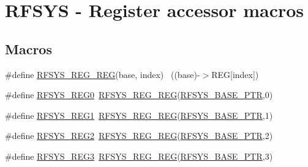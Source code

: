 \hypertarget{group___r_f_s_y_s___register___accessor___macros}{}\section{R\+F\+S\+YS -\/ Register accessor macros}
\label{group___r_f_s_y_s___register___accessor___macros}
\subsection*{Macros}
\begin{DoxyCompactItemize}
\item 
\#define \hyperlink{group___r_f_s_y_s___register___accessor___macros_ga95bd4c5a762f7e08df15fc92a585f926}{R\+F\+S\+Y\+S\+\_\+\+R\+E\+G\+\_\+\+R\+EG}(base,  index)                            ~((base)-\/$>$R\+EG\mbox{[}index\mbox{]})
\item 
\#define \hyperlink{group___r_f_s_y_s___register___accessor___macros_gac8659efbc5335c7c55ce700f560e641f}{R\+F\+S\+Y\+S\+\_\+\+R\+E\+G0}~\hyperlink{group___r_f_s_y_s___register___accessor___macros_ga95bd4c5a762f7e08df15fc92a585f926}{R\+F\+S\+Y\+S\+\_\+\+R\+E\+G\+\_\+\+R\+EG}(\hyperlink{group___r_f_s_y_s___peripheral_ga2dab66eae1abcaf22879dbce661ea2fa}{R\+F\+S\+Y\+S\+\_\+\+B\+A\+S\+E\+\_\+\+P\+TR},0)
\item 
\#define \hyperlink{group___r_f_s_y_s___register___accessor___macros_ga20ef6da127caf2238db5623847eb2ada}{R\+F\+S\+Y\+S\+\_\+\+R\+E\+G1}~\hyperlink{group___r_f_s_y_s___register___accessor___macros_ga95bd4c5a762f7e08df15fc92a585f926}{R\+F\+S\+Y\+S\+\_\+\+R\+E\+G\+\_\+\+R\+EG}(\hyperlink{group___r_f_s_y_s___peripheral_ga2dab66eae1abcaf22879dbce661ea2fa}{R\+F\+S\+Y\+S\+\_\+\+B\+A\+S\+E\+\_\+\+P\+TR},1)
\item 
\#define \hyperlink{group___r_f_s_y_s___register___accessor___macros_gaae849d61adc6c407683197d3dd93e2b8}{R\+F\+S\+Y\+S\+\_\+\+R\+E\+G2}~\hyperlink{group___r_f_s_y_s___register___accessor___macros_ga95bd4c5a762f7e08df15fc92a585f926}{R\+F\+S\+Y\+S\+\_\+\+R\+E\+G\+\_\+\+R\+EG}(\hyperlink{group___r_f_s_y_s___peripheral_ga2dab66eae1abcaf22879dbce661ea2fa}{R\+F\+S\+Y\+S\+\_\+\+B\+A\+S\+E\+\_\+\+P\+TR},2)
\item 
\#define \hyperlink{group___r_f_s_y_s___register___accessor___macros_ga66bdcfc079cddd40f67493cf57742ec4}{R\+F\+S\+Y\+S\+\_\+\+R\+E\+G3}~\hyperlink{group___r_f_s_y_s___register___accessor___macros_ga95bd4c5a762f7e08df15fc92a585f926}{R\+F\+S\+Y\+S\+\_\+\+R\+E\+G\+\_\+\+R\+EG}(\hyperlink{group___r_f_s_y_s___peripheral_ga2dab66eae1abcaf22879dbce661ea2fa}{R\+F\+S\+Y\+S\+\_\+\+B\+A\+S\+E\+\_\+\+P\+TR},3)

\end{DoxyCompactItemize}
